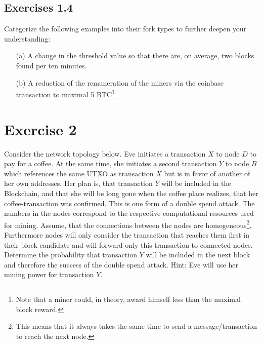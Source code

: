 \documentclass[12pt]{article}
\begin{document}
	\newpage
	\subsection*{Exercises 1.4}
	
	Categorize the following examples into their fork types to further deepen your understanding:
	
	\begin{itemize}
		\item[(a)] A change in the threshold value so that there are, on average, two blocks found per ten minutes.
		
		\item[(b)] A reduction of the remuneration of the miners via the coinbase transaction to maximal 5 BTC\footnote{Note that a miner could, in theory, award himself less than the maximal block reward.}
		
	\end{itemize}
	
	\section*{Exercise 2}
	
	Consider the network topology below. Eve initiates a transaction $X$ to node $D$ to pay for a coffee. At the same time, she initiates a second transaction $Y$ to node $B$ which references the same UTXO as transaction $X$ but is in favor of another of her own addresses. Her plan is, that transaction $Y$ will be included in the Blockchain, and that she will be long gone when the coffee place realizes, that her coffee-transaction was confirmed. This is one form of a double spend attack. The numbers in the nodes correspond to the respective computational resources used for mining. Assume, that the connections between the nodes are homogeneous\footnote{This means that it always takes the same time to send a message/transaction to reach the next node.}. Furthermore nodes will only consider the transaction that reaches them first in their block candidate and will forward only this transaction to connected nodes. Determine the probability that transaction $Y$ will be included in the next block and therefore the success of the double spend attack. Hint: Eve will use her mining power for transaction $Y$.
	
\end{document}
